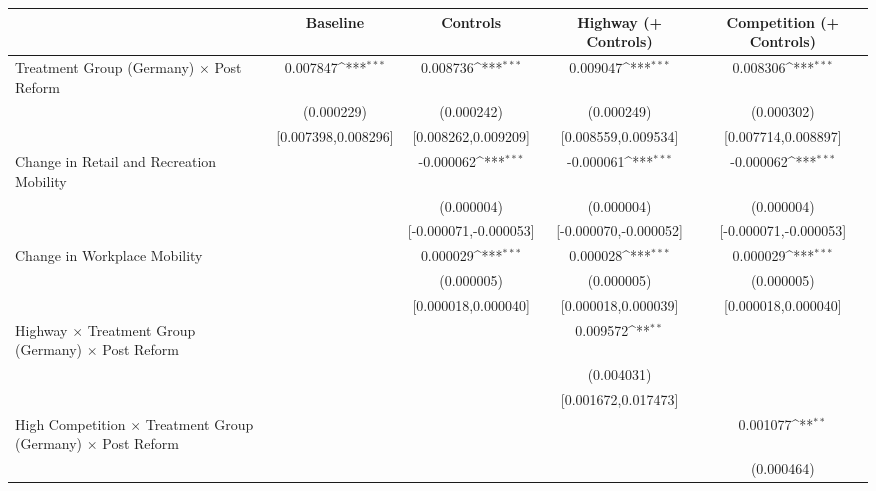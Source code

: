 {
\def\sym#1{\ifmmode^{#1}\else\(^{#1}\)\fi}
\begin{tabular}{l*{4}{c}}
\toprule
                    &\multicolumn{1}{c}{Baseline}&\multicolumn{1}{c}{Controls}&\multicolumn{1}{c}{Highway (+ Controls)}&\multicolumn{1}{c}{Competition (+ Controls)}\\
\midrule
Treatment Group (Germany) $\times$ Post Reform&    0.007847\sym{***}&    0.008736\sym{***}&    0.009047\sym{***}&    0.008306\sym{***}\\
                    &  (0.000229)         &  (0.000242)         &  (0.000249)         &  (0.000302)         \\
                    &[0.007398,0.008296]         &[0.008262,0.009209]         &[0.008559,0.009534]         &[0.007714,0.008897]         \\
Change in Retail and Recreation Mobility&                     &   -0.000062\sym{***}&   -0.000061\sym{***}&   -0.000062\sym{***}\\
                    &                     &  (0.000004)         &  (0.000004)         &  (0.000004)         \\
                    &                     &[-0.000071,-0.000053]         &[-0.000070,-0.000052]         &[-0.000071,-0.000053]         \\
Change in Workplace Mobility&                     &    0.000029\sym{***}&    0.000028\sym{***}&    0.000029\sym{***}\\
                    &                     &  (0.000005)         &  (0.000005)         &  (0.000005)         \\
                    &                     &[0.000018,0.000040]         &[0.000018,0.000039]         &[0.000018,0.000040]         \\
Highway $\times$ Treatment Group (Germany) $\times$ Post Reform&                     &                     &    0.009572\sym{**} &                     \\
                    &                     &                     &  (0.004031)         &                     \\
                    &                     &                     &[0.001672,0.017473]         &                     \\
High Competition $\times$ Treatment Group (Germany) $\times$ Post Reform&                     &                     &                     &    0.001077\sym{**} \\
                    &                     &                     &                     &  (0.000464)         \\

\end{tabular}}

